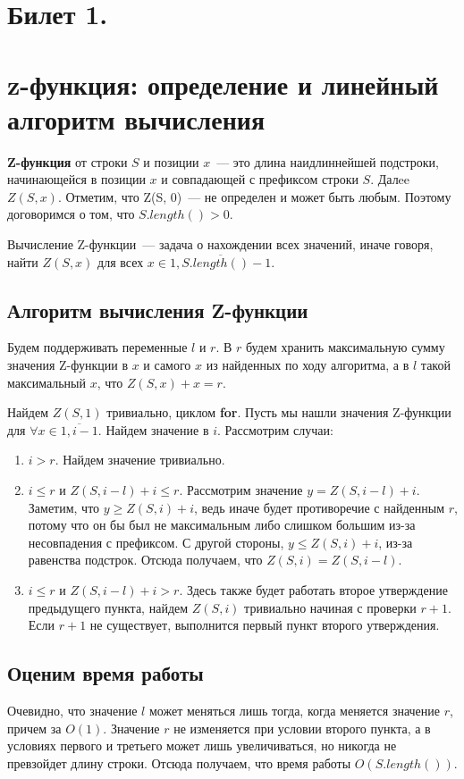\section{Билет 1.}
\section*{z-функция: определение и линейный алгоритм вычисления}
\par
\textbf{Z-функция} от строки $S$ и позиции $x$~--- это длина наидлиннейшей подстроки,
начинающейся в позиции $x$ и совпадающей с префиксом строки $S$. Далee $Z(S, x)$.
Отметим, что Z(S, 0)~--- не определен и может быть любым. Поэтому договоримся о том, что
$S.length() > 0$.

\par
Вычисление Z-функции~--- задача о нахождении всех значений, иначе говоря, найти
$Z(S, x)$ для всех $x \in \overline{1, S.length() - 1}$.

\subsection*{Алгоритм вычисления Z-функции}

Будем поддерживать переменные $l$ и $r$.
В $r$ будем хранить максимальную сумму значения Z-функции в $x$ и самого $x$ из найденных по ходу алгоритма,
а в $l$ такой максимальный $x$, что $Z(S, x) + x = r$.

\par
Найдем $Z(S, 1)$ тривиально, циклом \textbf{for}. Пусть мы нашли значения Z-функции
для $\forall x \in \overline{1, i - 1}$. Найдем значение в $i$. Рассмотрим случаи:

\begin{enumerate}
    \item $i > r$.
Найдем значение тривиально.
    \item $i \leq  r$ и $Z(S, i - l) + i \leq r$. Рассмотрим значение $y = Z(S, i - l) + i$.
Заметим, что $y \geq  Z(S, i) + i$, ведь иначе будет противоречие с найденным $r$, потому что он бы был не максимальным
либо слишком большим из-за несовпадения с префиксом. С другой стороны, $y \leq Z(S, i) + i$, из-за равенства подстрок.
Отсюда получаем, что $Z(S, i) = Z(S, i - l)$.
    \item $i \leq r$ и $Z(S, i - l) + i > r$. Здесь также будет работать второе утверждение предыдущего пункта, 
    найдем $Z(S, i)$ тривиально начиная с проверки $r+1$. Если $r+1$ не существует, выполнится первый пункт второго утверждения.
\end{enumerate}

\subsection*{Оценим время работы}
\par
Очевидно, что значение $l$ может меняться лишь тогда, когда меняется значение $r$, причем за $O(1)$.
Значение $r$ не изменяется при условии второго пункта, а в условиях первого и третьего может лишь увеличиваться,
но никогда не превзойдет длину строки. Отсюда получаем, что время работы $O(S.length())$.